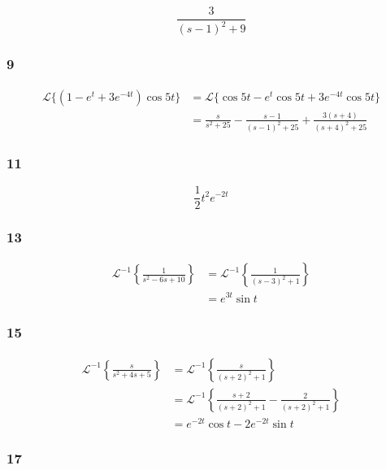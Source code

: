 \documentclass{article}
\begin{document}
\[\frac{3}{(s - 1)^2 + 9}\]

\subsubsection{9}

\begin{align*}
  \mathcal{L}\{(1 - e^t + 3 e^{-4 t}) \cos 5 t\} & = \mathcal{L}\{\cos 5 t - e^t \cos 5 t + 3 e^{-4 t} \cos 5 t\}                         \\
                                                 & = \frac{s}{s^2 + 25} - \frac{s - 1}{(s - 1)^2 + 25} + \frac{3 (s + 4)}{(s + 4)^2 + 25}
\end{align*}

\subsubsection{11}

\[\frac{1}{2} t^2 e^{-2 t}\]

\subsubsection{13}

\begin{align*}
  \mathcal{L}^{-1} \left\{ \frac{1}{s^2 - 6 s + 10} \right\} & = \mathcal{L}^{-1} \left\{ \frac{1}{(s - 3)^2 + 1} \right\} \\
                                                             & = e^{3 t} \sin t
\end{align*}

\subsubsection{15}

\begin{align*}
  \mathcal{L}^{-1} \left\{ \frac{s}{s^2 + 4 s + 5} \right\} & = \mathcal{L}^{-1} \left\{ \frac{s}{(s + 2)^2 + 1} \right\}                               \\
                                                            & = \mathcal{L}^{-1} \left\{ \frac{s + 2}{(s + 2)^2 + 1} - \frac{2}{(s + 2)^2 + 1} \right\} \\
                                                            & = e^{-2 t} \cos t - 2 e^{-2 t} \sin t
\end{align*}

\subsubsection{17}
\end{document}
